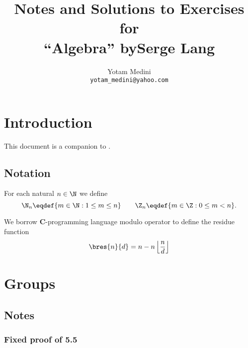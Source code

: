 \documentclass[12pt]{book}
\title{
 Notes and Solutions to Exercises\\
 for\\
 ``Algebra'' \quad by\quad  Serge Lang}
\author{Yotam Medini\\\texttt{yotam\_medini@yahoo.com}}
\begin{document}
\maketitle
\newpage
\tableofcontents
\newpage

\chapter*{Introduction}

This document is a companion to \cite{Lan94}.

\section*{Notation}

For each natural \(n\in\N\) we define
\begin{equation*}
\N_n \eqdef \{m\in\N: 1\leq m \leq n\} \qquad
\Z_n \eqdef \{m\in\Z: 0\leq m < n\}.
\end{equation*}

We borrow \textbf{C}-programming language modulo operator 
to define the residue function
\begin{equation*}
\bres{n}{d} = n - n \left\lfloor \frac{n}{d} \right\rfloor
\end{equation*}


\chapter{Groups}

\section{Notes}

\subsection{Fixed proof of 5.5}
\end{document}
